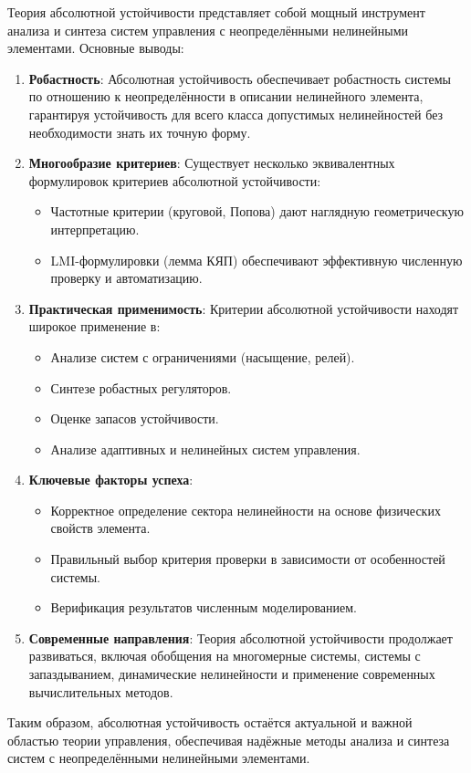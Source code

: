 Теория абсолютной устойчивости представляет собой мощный инструмент анализа и синтеза систем управления с неопределёнными нелинейными элементами. Основные выводы:

\begin{enumerate}
    \item \textbf{Робастность}: Абсолютная устойчивость обеспечивает робастность системы по отношению к неопределённости в описании нелинейного элемента, гарантируя устойчивость для всего класса допустимых нелинейностей без необходимости знать их точную форму.
    
    \item \textbf{Многообразие критериев}: Существует несколько эквивалентных формулировок критериев абсолютной устойчивости:
    \begin{itemize}
        \item Частотные критерии (круговой, Попова) дают наглядную геометрическую интерпретацию.
        \item LMI-формулировки (лемма КЯП) обеспечивают эффективную численную проверку и автоматизацию.
    \end{itemize}
    
    \item \textbf{Практическая применимость}: Критерии абсолютной устойчивости находят широкое применение в:
    \begin{itemize}
        \item Анализе систем с ограничениями (насыщение, релей).
        \item Синтезе робастных регуляторов.
        \item Оценке запасов устойчивости.
        \item Анализе адаптивных и нелинейных систем управления.
    \end{itemize}
    
    \item \textbf{Ключевые факторы успеха}:
    \begin{itemize}
        \item Корректное определение сектора нелинейности на основе физических свойств элемента.
        \item Правильный выбор критерия проверки в зависимости от особенностей системы.
        \item Верификация результатов численным моделированием.
    \end{itemize}
    
    \item \textbf{Современные направления}: Теория абсолютной устойчивости продолжает развиваться, включая обобщения на многомерные системы, системы с запаздыванием, динамические нелинейности и применение современных вычислительных методов.
\end{enumerate}

Таким образом, абсолютная устойчивость остаётся актуальной и важной областью теории управления, обеспечивая надёжные методы анализа и синтеза систем с неопределёнными нелинейными элементами.

